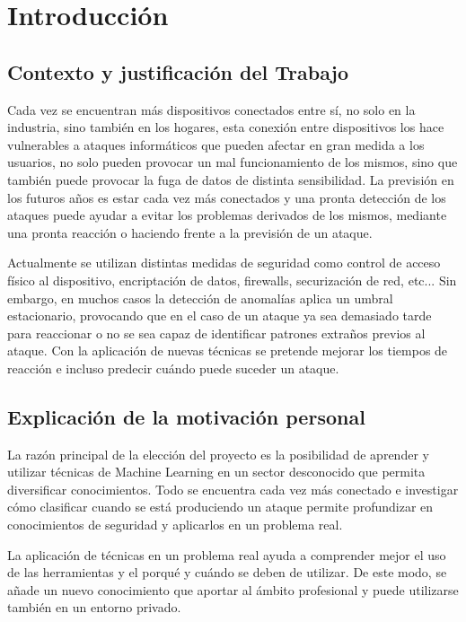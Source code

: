 \chapter{Introducción}
\label{chapter:introduccion}


\section{Contexto y justificación del Trabajo}
Cada vez se encuentran más dispositivos conectados entre sí, no solo en la industria, sino también en los hogares, esta conexión entre dispositivos los hace vulnerables a ataques informáticos que pueden afectar en gran medida a los usuarios, no solo pueden provocar un mal funcionamiento de los mismos, sino que también puede provocar la fuga de datos de distinta sensibilidad. La previsión en los futuros años es estar cada vez más conectados y una pronta detección de los ataques puede ayudar a evitar los problemas derivados de los mismos, mediante una pronta reacción o haciendo frente a la previsión de un ataque.



Actualmente se utilizan distintas medidas de seguridad como control de acceso físico al dispositivo, encriptación de datos, firewalls, securización de red, etc... Sin embargo, en muchos casos la detección de anomalías aplica un umbral estacionario, provocando que en el caso de un ataque ya sea demasiado tarde para reaccionar o no se sea capaz de identificar patrones extraños previos al ataque. Con la aplicación de nuevas técnicas se pretende mejorar los tiempos de reacción e incluso predecir cuándo puede suceder un ataque.

\section{Explicación de la motivación personal}
La razón principal de la elección del proyecto es la posibilidad de aprender y utilizar técnicas de Machine Learning en un sector desconocido que permita diversificar conocimientos. Todo se encuentra cada vez más conectado e investigar cómo clasificar cuando se está produciendo un ataque permite profundizar en conocimientos de seguridad y aplicarlos en un problema real.



La aplicación de técnicas en un problema real ayuda a comprender mejor el uso de las herramientas y el porqué y cuándo se deben de utilizar. De este modo, se añade un nuevo conocimiento que aportar al ámbito profesional y puede utilizarse también en un entorno privado.


